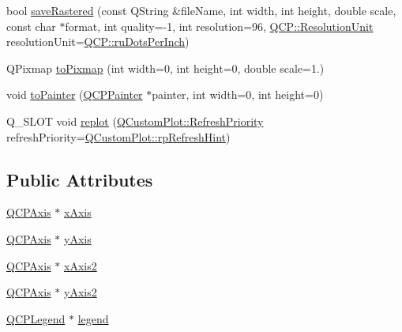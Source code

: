 \begin{DoxyCompactItemize}
\item 
bool \mbox{\hyperlink{class_q_custom_plot_ad7723ce2edfa270632ef42b03a444352}{save\+Rastered}} (const Q\+String \&file\+Name, int width, int height, double scale, const char $\ast$format, int quality=-\/1, int resolution=96, \mbox{\hyperlink{namespace_q_c_p_a715d46153da230990aa887d0f0602452}{Q\+C\+P\+::\+Resolution\+Unit}} resolution\+Unit=\mbox{\hyperlink{namespace_q_c_p_a715d46153da230990aa887d0f0602452affb887d8efe79c39a1aca2acd7002afc}{Q\+C\+P\+::ru\+Dots\+Per\+Inch}})
\item 
Q\+Pixmap \mbox{\hyperlink{class_q_custom_plot_aabb974d71ce96c137dc04eb6eab844fe}{to\+Pixmap}} (int width=0, int height=0, double scale=1.)
\item 
void \mbox{\hyperlink{class_q_custom_plot_a1be68d5c0f1e086d6374d1340a193fb9}{to\+Painter}} (\mbox{\hyperlink{class_q_c_p_painter}{Q\+C\+P\+Painter}} $\ast$painter, int width=0, int height=0)
\item 
Q\+\_\+\+S\+L\+OT void \mbox{\hyperlink{class_q_custom_plot_aa4bfe7d70dbe67e81d877819b75ab9af}{replot}} (\mbox{\hyperlink{class_q_custom_plot_a45d61392d13042e712a956d27762aa39}{Q\+Custom\+Plot\+::\+Refresh\+Priority}} refresh\+Priority=\mbox{\hyperlink{class_q_custom_plot_a45d61392d13042e712a956d27762aa39a49666a5854a68dbcca8b277b03331260}{Q\+Custom\+Plot\+::rp\+Refresh\+Hint}})
\end{DoxyCompactItemize}
\subsection*{Public Attributes}
\begin{DoxyCompactItemize}
\item 
\mbox{\hyperlink{class_q_c_p_axis}{Q\+C\+P\+Axis}} $\ast$ \mbox{\hyperlink{class_q_custom_plot_a9a79cd0158a4c7f30cbc702f0fd800e4}{x\+Axis}}
\item 
\mbox{\hyperlink{class_q_c_p_axis}{Q\+C\+P\+Axis}} $\ast$ \mbox{\hyperlink{class_q_custom_plot_af6fea5679725b152c14facd920b19367}{y\+Axis}}
\item 
\mbox{\hyperlink{class_q_c_p_axis}{Q\+C\+P\+Axis}} $\ast$ \mbox{\hyperlink{class_q_custom_plot_ada41599f22cad901c030f3dcbdd82fd9}{x\+Axis2}}
\item 
\mbox{\hyperlink{class_q_c_p_axis}{Q\+C\+P\+Axis}} $\ast$ \mbox{\hyperlink{class_q_custom_plot_af13fdc5bce7d0fabd640f13ba805c0b7}{y\+Axis2}}
\item 
\mbox{\hyperlink{class_q_c_p_legend}{Q\+C\+P\+Legend}} $\ast$ \mbox{\hyperlink{class_q_custom_plot_a4eadcd237dc6a09938b68b16877fa6af}{legend}}
\end{DoxyCompactItemize}
